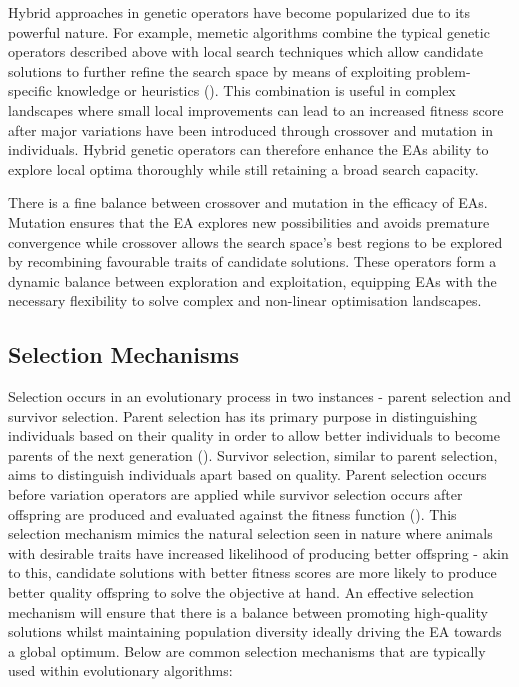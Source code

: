 \parbreak\noindent Hybrid approaches in genetic operators have become popularized due to its powerful nature. For example, memetic algorithms combine the typical genetic operators described above with local search techniques which allow candidate solutions to further refine the search space by means of exploiting problem-specific knowledge or heuristics (\cite{neri2012memetic}). This combination is useful in complex landscapes where small local improvements can lead to an increased fitness score after major variations have been introduced through crossover and mutation in individuals. Hybrid genetic operators can therefore enhance the EAs ability to explore local optima thoroughly while still retaining a broad search capacity.

\parbreak\noindent There is a fine balance between crossover and mutation in the efficacy of EAs. Mutation ensures that the EA explores new possibilities and avoids premature convergence while crossover allows the search space's best regions to be explored by recombining favourable traits of candidate solutions. These operators form a dynamic balance between exploration and exploitation, equipping EAs with the necessary flexibility to solve complex and non-linear optimisation landscapes.

\subsection{Selection Mechanisms}\label{sec:selection_mechanisms}
Selection occurs in an evolutionary process in two instances - parent selection and survivor selection. Parent selection has its primary purpose in distinguishing individuals based on their quality in order to allow better individuals to become parents of the next generation (\cite{handsOnGeneticAlgorithms}). Survivor selection, similar to parent selection, aims to distinguish individuals apart based on quality. Parent selection occurs before variation operators are applied while survivor selection occurs after offspring are produced and evaluated against the fitness function (\cite{book_introduction_to_evolutionary_computing}). This selection mechanism mimics the natural selection seen in nature where animals with desirable traits have increased likelihood of producing better offspring - akin to this, candidate solutions with better fitness scores are more likely to produce better quality offspring to solve the objective at hand. An effective selection mechanism will ensure that there is a balance between promoting high-quality solutions whilst maintaining population diversity ideally driving the EA towards a global optimum. Below are common selection mechanisms that are typically used within evolutionary algorithms:

